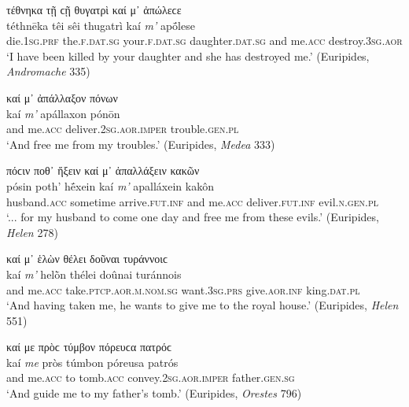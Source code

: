 \begin{exe}
\ex τέθνηκα τῇ ϲῇ θυγατρὶ καί μ᾽ ἀπώλεϲε\\
\gll téthnēka têi sêi thugatrì kaí \emph{m'} apṓlese\\
die.\textsc{1sg.prf} the.\textsc{f.dat.sg} your.\textsc{f.dat.sg}
daughter.\textsc{dat.sg} and me.\textsc{acc} destroy.\textsc{3sg.aor}\\
\trans `I have been killed by your daughter and she has destroyed me.' (Euripides, \textit{Andromache} 335)
\label{kaime11}
\end{exe}

\begin{exe}
\ex καί μ᾽ ἀπάλλαξον πόνων\\
\gll kaí \emph{m'} apállaxon pónōn\\
and me.\textsc{acc} deliver.\textsc{2sg.aor.imper} trouble.\textsc{gen.pl}\\
\trans `And free me from my troubles.' (Euripides, \textit{Medea} 333)
\label{kaime12}
\end{exe}

\begin{exe}
\ex πόϲιν ποθ᾽ ἥξειν καί μ᾽ ἀπαλλάξειν κακῶν\\
\gll pósin poth' hḗxein kaí \emph{m'} apalláxein kakôn\\
husband.\textsc{acc} sometime arrive.\textsc{fut.inf} and
me.\textsc{acc} deliver.\textsc{fut.inf} evil.\textsc{n.gen.pl}\\
\trans `... for my husband to come one day and free me from these evils.' (Euripides, \textit{Helen} 278)
\label{kaime13}
\end{exe}

\begin{exe}
\ex καί μ᾽ ἑλὼν θέλει δοῦναι τυράννοιϲ\\
\gll kaí \emph{m'} helṑn thélei doûnai turánnois\\
and me.\textsc{acc} take.\textsc{ptcp.aor.m.nom.sg} want.\textsc{3sg.prs} give.\textsc{aor.inf} king.\textsc{dat.pl}\\
\trans `And having taken me, he wants to give me to the royal house.' (Euripides, \textit{Helen} 551)
\label{kaime14}
\end{exe}

\begin{exe}
\ex καί με πρὸϲ τύμβον πόρευϲα πατρόϲ\\
\gll kaí \emph{me} pròs túmbon póreusa patrós\\
and me.\textsc{acc} to tomb.\textsc{acc} convey.\textsc{2sg.aor.imper}
father.\textsc{gen.sg}\\
\trans `And guide me to my father's tomb.' (Euripides, \textit{Orestes} 796)
\label{kaime15}
\end{exe}

